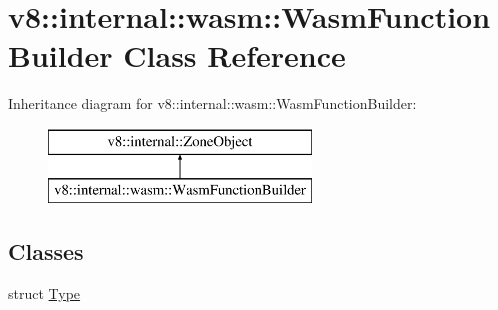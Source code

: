 \hypertarget{classv8_1_1internal_1_1wasm_1_1_wasm_function_builder}{}\section{v8\+:\+:internal\+:\+:wasm\+:\+:Wasm\+Function\+Builder Class Reference}
\label{classv8_1_1internal_1_1wasm_1_1_wasm_function_builder}
Inheritance diagram for v8\+:\+:internal\+:\+:wasm\+:\+:Wasm\+Function\+Builder\+:\begin{figure}[H]
\begin{center}
\leavevmode
\includegraphics[height=2.000000cm]{classv8_1_1internal_1_1wasm_1_1_wasm_function_builder}
\end{center}
\end{figure}
\subsection*{Classes}
\begin{DoxyCompactItemize}
\item 
struct \hyperlink{structv8_1_1internal_1_1wasm_1_1_wasm_function_builder_1_1_type}{Type}
\end{DoxyCompactItemize}
